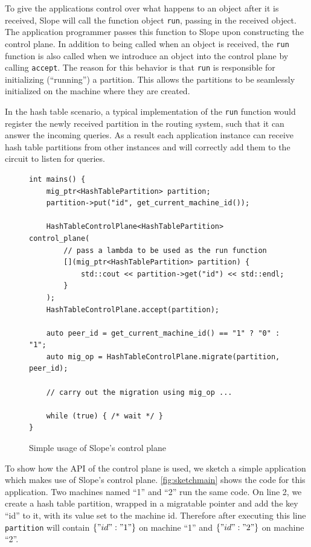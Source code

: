 To give the applications control over what happens to an object after it is
received, Slope will call the function object \texttt{run}, passing in the
received object. The application programmer passes this function to Slope upon
constructing the control plane. In addition to being called when an object is
received, the \texttt{run} function is also called when we introduce an object
into the control plane by calling \texttt{accept}. The reason for this behavior
is that \texttt{run} is responsible for initializing (``running'') a partition.
This allows the partitions to be seamlessly initialized on the machine where they
are created.


In the hash table scenario, a typical
implementation of the \texttt{run} function would register the newly received
partition in the routing system, such that it can answer the incoming queries.
As a result each application instance can receive hash table partitions from
other instances and will correctly add them to the circuit to listen for queries.


\begin{figure}[tp]
\begin{lstlisting}
int mains() {
    mig_ptr<HashTablePartition> partition;
    partition->put("id", get_current_machine_id());

    HashTableControlPlane<HashTablePartition> control_plane(
        // pass a lambda to be used as the run function
        [](mig_ptr<HashTablePartition> partition) {
            std::cout << partition->get("id") << std::endl;
        }
    );
    HashTableControlPlane.accept(partition);

    auto peer_id = get_current_machine_id() == "1" ? "0" : "1";
    auto mig_op = HashTableControlPlane.migrate(partition, peer_id);

    // carry out the migration using mig_op ...

    while (true) { /* wait */ }
}
\end{lstlisting}
\caption{
    Simple usage of Slope's control plane
}
\label{fig:sketchmain}
\end{figure}

To show how the API of the control plane is used, we sketch a simple application
which makes use of Slope's control plane.
\autoref{fig:sketchmain} shows the code for this application. Two machines
named ``1'' and ``2'' run the same code. On line 2, we create a hash table
partition, wrapped in a migratable pointer and add the key ``id'' to it, with its
value set to the machine id. Therefore after executing this line
\texttt{partition} will contain $\{"id": "1"\}$
on machine ``1'' and $\{"id": "2"\}$ on machine ``2''.

